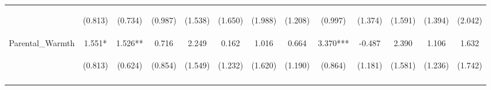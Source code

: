 \begin{tabular}{lcccccccccccc}
 & \begin{footnotesize}(0.813)\end{footnotesize} & \begin{footnotesize}(0.734)\end{footnotesize} & \begin{footnotesize}(0.987)\end{footnotesize} & \begin{footnotesize}(1.538)\end{footnotesize} & \begin{footnotesize}(1.650)\end{footnotesize} & \begin{footnotesize}(1.988)\end{footnotesize} & \begin{footnotesize}(1.208)\end{footnotesize} & \begin{footnotesize}(0.997)\end{footnotesize} & \begin{footnotesize}(1.374)\end{footnotesize} & \begin{footnotesize}(1.591)\end{footnotesize} & \begin{footnotesize}(1.394)\end{footnotesize} & \begin{footnotesize}(2.042)\end{footnotesize}\\
\noalign{\smallskip}Parental\_Warmth & 1.551* & 1.526** & 0.716 & 2.249 & 0.162 & 1.016 & 0.664 & 3.370*** & -0.487 & 2.390 & 1.106 & 1.632\\
 & \begin{footnotesize}(0.813)\end{footnotesize} & \begin{footnotesize}(0.624)\end{footnotesize} & \begin{footnotesize}(0.854)\end{footnotesize} & \begin{footnotesize}(1.549)\end{footnotesize} & \begin{footnotesize}(1.232)\end{footnotesize} & \begin{footnotesize}(1.620)\end{footnotesize} & \begin{footnotesize}(1.190)\end{footnotesize} & \begin{footnotesize}(0.864)\end{footnotesize} & \begin{footnotesize}(1.181)\end{footnotesize} & \begin{footnotesize}(1.581)\end{footnotesize} & \begin{footnotesize}(1.236)\end{footnotesize} & \begin{footnotesize}(1.742)\end{footnotesize}\\
\noalign{\smallskip}\hline\end{tabular}\\
